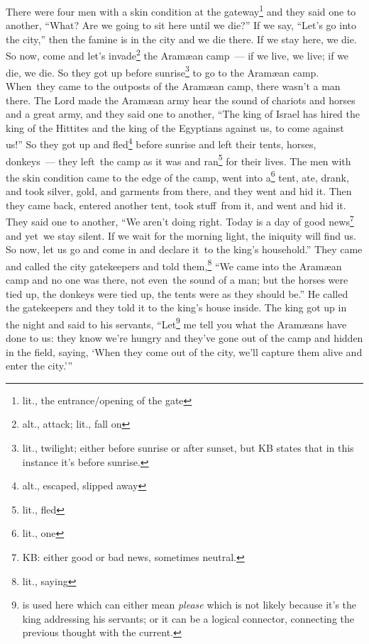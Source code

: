 \begin{inparaenum}
     There were four men with a skin condition at the gateway\footnote{lit., the entrance/opening of the gate} and they said one to another, ``What? Are we going to sit here until we die?''%
     If we say, ``Let's go into the city,'' then the famine is in the city and we die there. If we stay here, we die. So now, come and let's invade\footnote{alt., attack; lit., fall on} the Aram\ae{}an camp~--- if we live, we live; if we die, we die.%
     So they got up before sunrise\footnote{lit., twilight; either before sunrise or after sunset, but KB states that in this instance it's before sunrise.} to go to the Aram\ae{}an camp. When\understood\ they came to the outposts of the Aram\ae{}an camp, there wasn't a man there.%
     The Lord made the Aram\ae{}an army hear the sound of chariots and horses and a great army, and they said one to another, ``The king of Israel has hired the king of the Hittites and the king of the Egyptians against us, to come against us!''%
     So they got up and fled\footnote{alt., escaped, slipped away} before sunrise and left their tents, horses, donkeys~--- they left\understood\ the camp as it was and ran\footnote{lit., fled} for their lives.%
     The men with the skin condition came to the edge of the camp, went into a\footnote{lit., one} tent, ate, drank, and took silver, gold, and garments from there, and they went and hid it. Then they came back, entered another tent, took stuff\understood\ from it, and went and hid it.%
     They said one to another, ``We aren't doing right. Today is a day of good news\footnote{KB: either good or bad news, sometimes neutral.} and yet\understood\ we stay silent. If we wait for the morning light, the iniquity will find us. So now, let us go and come in and declare it\understood\ to the king's household.''%
     They came and called the city gatekeepers and told them,\footnote{lit., saying} ``We came into the Aram\ae{}an camp and no one was there, not even\understood\ the sound of a man; but the horses were tied up, the donkeys were tied up, the tents were as they should be.''\thinspace\understood%
     He called the gatekeepers and they told it to the king's house inside.%
     The king got up in the night and said to his servants, ``Let\footnote{ is used here which can either mean \textit{please} which is not likely because it's the king addressing his servants; or it can be a logical connector, connecting the previous thought with the current.} me tell you what the Aram\ae{}ans have done to us: they know we're hungry and they've gone out of the camp and hidden in the field, saying, `When they come out of the city, we'll capture them alive and enter the city.'\thinspace''%

\end{inparaenum}
